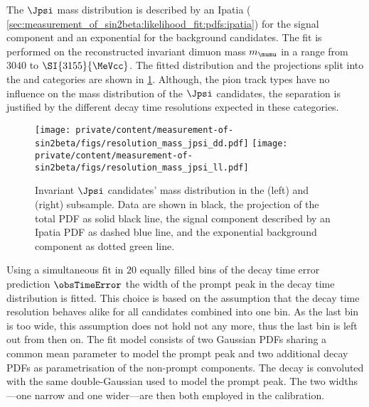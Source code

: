 The $\Jpsi$ mass distribution is described by an Ipatia \PDF (\cf
\cref{sec:measurement_of_sin2beta:likelihood_fit:pdfs:ipatia}) for the signal
component and an exponential \PDF for the background candidates. The fit is
performed on the reconstructed invariant dimuon mass $m_{\mumu}$ in a range from
$\num{3040}$ to $\SI{3155}{\MeVcc}$. The fitted distribution and the \PDF
projections split into the \catDD and \catLL categories are shown in 
\cref{fig:measurement_of_sin2beta:resolution_and_acceptance:resolution:jpsi_mass}. 
Although, the pion track types have no influence on the mass distribution of the
$\Jpsi$ candidates, the separation is justified by the different decay time
resolutions expected in these categories.
%
\begin{figure}[h]
\texttt{[image: private/content/measurement-of-sin2beta/figs/resolution\_mass\_jpsi\_dd.pdf]}
\texttt{[image: private/content/measurement-of-sin2beta/figs/resolution\_mass\_jpsi\_ll.pdf]}
\caption{Invariant $\Jpsi$ candidates' mass distribution in the (left) \catDD
and (right) \catLL subsample. Data are shown in black, the projection of the
total \acs{PDF} as solid black line, the signal component described by an Ipatia
\acs{PDF} as dashed blue line, and the exponential background component as
dotted green line.}
\label{fig:measurement_of_sin2beta:resolution_and_acceptance:resolution:jpsi_mass}
\end{figure}
%
Using a simultaneous fit in $\num{20}$ equally filled bins of the decay time
error prediction $\obsTimeError$ the width of the prompt peak in the decay time
distribution is fitted. This choice is based on the assumption that the decay
time resolution behaves alike for all candidates combined into one bin. As the
last bin is too wide, this assumption does not hold not any more, thus the last
bin is left out from then on. The fit model consists of two Gaussian \acp{PDF}
sharing a common mean parameter to model the prompt peak and two additional
decay \acp{PDF} as parametrisation of the non-prompt components. The decay \PDF
is convoluted with the same double-Gaussian \PDF used to model the prompt peak.
The two widths---one narrow and one wider---are then both employed in the
calibration.

